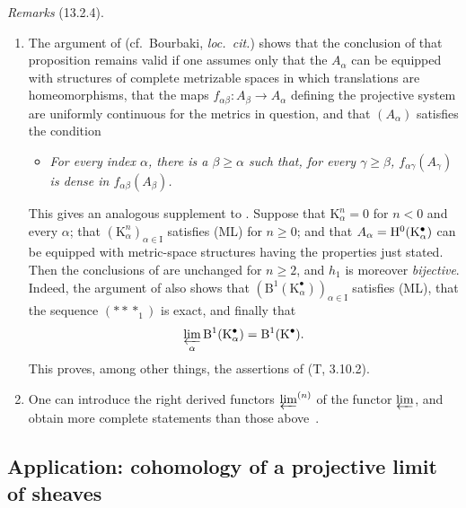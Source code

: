 \begin{env}[13.2.4]
\label{0.13.2.4}
\emph{Remarks} (13.2.4).
\begin{enumerate}
  \item[{\rm(i)}]
  The argument of 
  (cf.\ Bourbaki, \emph{loc.\ cit.}) shows that the conclusion of
  that proposition remains valid if one assumes only that the
  $A_\alpha$ can be equipped with structures of complete metrizable
  spaces in which translations are homeomorphisms, that the maps
  $f_{\alpha\beta}:A_\beta\longrightarrow A_\alpha$ defining the
  projective system are uniformly continuous for the metrics in
  question, and that $(A_\alpha)$ satisfies the condition
  \begin{itemize}
    \item[(ML$'$)]
    \emph{For every index $\alpha$, there is a $\beta\geq\alpha$ such
    that, for every $\gamma\geq\beta$,
    $f_{\alpha\gamma}(A_\gamma)$ is dense in
    $f_{\alpha\beta}(A_\beta)$.}
  \end{itemize}

  This gives an analogous supplement to .
  Suppose that $\mathrm{K}^n_\alpha=0$ for $n<0$ and every $\alpha$;
  that
  $(\mathrm{K}^n_\alpha)_{\alpha\in\mathrm{I}}$ satisfies (ML) for
  $n\geq0$; and that
  $A_\alpha=\mathrm{H}^0(\mathrm{K}^\bullet_\alpha)$ can be equipped with
  metric-space structures having the properties just stated.
  Then the conclusions of  are unchanged for
  $n\geq2$, and $h_1$ is moreover \emph{bijective}.
  Indeed, the argument of  also shows that
  $(\mathrm{B}^1(\mathrm{K}^\bullet_\alpha))_{\alpha\in\mathrm{I}}$
  satisfies (ML), that the sequence $(***_1)$ is exact, and finally
  that
  \[
    \varprojlim_\alpha
    \mathrm{B}^1(\mathrm{K}^\bullet_\alpha)
    =
    \mathrm{B}^1(\mathrm{K}^\bullet).
  \]
  This proves, among other things, the assertions of (T, 3.10.2).

  \item[{\rm(ii)}]
  One can introduce the right derived functors
  $\varprojlim^{(n)}$ of the functor $\varprojlim$, and obtain more
  complete statements than those above~\cite{III-28}.
\end{enumerate}
\end{env}

\subsection{Application: cohomology of a projective limit of sheaves}
\label{subsection:0.13.3}

